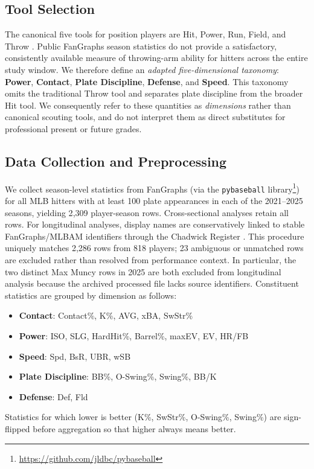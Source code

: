 \documentclass[10pt,twocolumn,letterpaper]{article}
\begin{document}
\subsection{Tool Selection}
The canonical five tools for position players are Hit, Power, Run, Field, and Throw \cite{mcdaniel2014}. Public FanGraphs season statistics do not provide a satisfactory, consistently available measure of throwing-arm ability for hitters across the entire study window. We therefore define an \emph{adapted five-dimensional taxonomy}: \textbf{Power}, \textbf{Contact}, \textbf{Plate Discipline}, \textbf{Defense}, and \textbf{Speed}. This taxonomy omits the traditional Throw tool and separates plate discipline from the broader Hit tool. We consequently refer to these quantities as \emph{dimensions} rather than canonical scouting tools, and do not interpret them as direct substitutes for professional present or future grades.

\subsection{Data Collection and Preprocessing}
\label{sec:data}
We collect season-level statistics from FanGraphs (via the \texttt{pybaseball} library\footnote{\url{https://github.com/jldbc/pybaseball}}) for all MLB hitters with at least 100 plate appearances in each of the 2021--2025 seasons, yielding 2{,}309 player-season rows. Cross-sectional analyses retain all rows. For longitudinal analyses, display names are conservatively linked to stable FanGraphs/MLBAM identifiers through the Chadwick Register \cite{chadwickRegister}. This procedure uniquely matches 2{,}286 rows from 818 players; 23 ambiguous or unmatched rows are excluded rather than resolved from performance context. In particular, the two distinct Max Muncy rows in 2025 are both excluded from longitudinal analysis because the archived processed file lacks source identifiers. Constituent statistics are grouped by dimension as follows:
\begin{itemize}
  \item \textbf{Contact}: Contact\%, K\%, AVG, xBA, SwStr\%
  \item \textbf{Power}: ISO, SLG, HardHit\%, Barrel\%, maxEV, EV, HR/FB
  \item \textbf{Speed}: Spd, BsR, UBR, wSB
  \item \textbf{Plate Discipline}: BB\%, O-Swing\%, Swing\%, BB/K
  \item \textbf{Defense}: Def, Fld
\end{itemize}
Statistics for which lower is better (K\%, SwStr\%, O-Swing\%, Swing\%) are sign-flipped before aggregation so that higher always means better.
\end{document}
